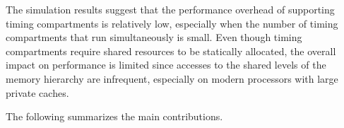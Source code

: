

The simulation results suggest that the performance overhead of supporting
timing compartments is relatively low, especially when the number of timing
compartments that run simultaneously is small.
Even though timing compartments require shared resources to be statically
allocated, the overall impact on performance is limited since accesses to the
shared levels of the memory hierarchy are infrequent, especially on modern
processors with large private caches.

The following summarizes the main contributions.

